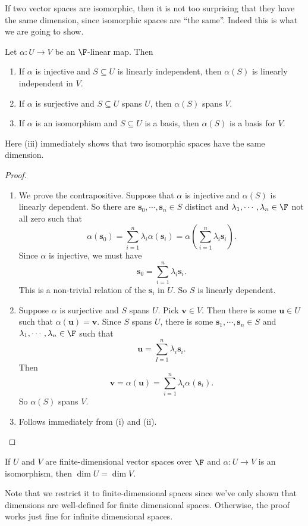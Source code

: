\documentclass[a4paper]{article}
\begin{document}
If two vector spaces are isomorphic, then it is not too surprising that they have the same dimension, since isomorphic spaces are ``the same''. Indeed this is what we are going to show.
\begin{prop}
  Let $\alpha: U\to V$ be an $\F$-linear map. Then
  \begin{enumerate}
    \item If $\alpha$ is injective and $S\subseteq U$ is linearly independent, then $\alpha (S)$ is linearly independent in $V$.
    \item If $\alpha$ is surjective and $S\subseteq U$ spans $U$, then $\alpha (S)$ spans $V$.
    \item If $\alpha$ is an isomorphism and $S\subseteq U$ is a basis, then $\alpha(S)$ is a basis for $V$.
  \end{enumerate}
\end{prop}
Here (iii) immediately shows that two isomorphic spaces have the same dimension.
\begin{proof}\leavevmode
  \begin{enumerate}
    \item We prove the contrapositive. Suppose that $\alpha$ is injective and $\alpha(S)$ is linearly dependent. So there are $\mathbf{s}_0, \cdots, \mathbf{s}_n \in S$ distinct and $\lambda_1, \cdots, \lambda_n\in \F$ not all zero such that
      \[
        \alpha(\mathbf{s}_0) = \sum_{i = 1}^n \lambda_i \alpha(\mathbf{s}_i) = \alpha\left(\sum_{i = 1}^n \lambda_i \mathbf{s}_i\right).
      \]
      Since $\alpha$ is injective, we must have
      \[
        \mathbf{s}_0 = \sum_{i = 1}^n \lambda_i \mathbf{s}_i.
      \]
      This is a non-trivial relation of the $\mathbf{s}_i$ in $U$. So $S$ is linearly dependent.
    \item Suppose $\alpha$ is surjective and $S$ spans $U$. Pick $\mathbf{v} \in V$. Then there is some $\mathbf{u}\in U$ such that $\alpha(\mathbf{u}) = \mathbf{v}$. Since $S$ spans $U$, there is some $\mathbf{s}_1, \cdots, \mathbf{s}_n\in S$ and $\lambda_1, \cdots, \lambda_n\in \F$ such that
      \[
        \mathbf{u} = \sum_{I = 1}^n \lambda_i \mathbf{s}_i.
      \]
      Then
      \[
        \mathbf{v} = \alpha (\mathbf{u}) = \sum_{i = 1}^n \lambda_i \alpha (\mathbf{s}_i).
      \]
      So $\alpha (S)$ spans $V$.
    \item Follows immediately from (i) and (ii).\qedhere
  \end{enumerate}
\end{proof}

\begin{cor}
  If $U$ and $V$ are finite-dimensional vector spaces over $\F$ and $\alpha: U\to V$ is an isomorphism, then $\dim U = \dim V$.
\end{cor}
Note that we restrict it to finite-dimensional spaces since we've only shown that dimensions are well-defined for finite dimensional spaces. Otherwise, the proof works just fine for infinite dimensional spaces.
\end{document}
